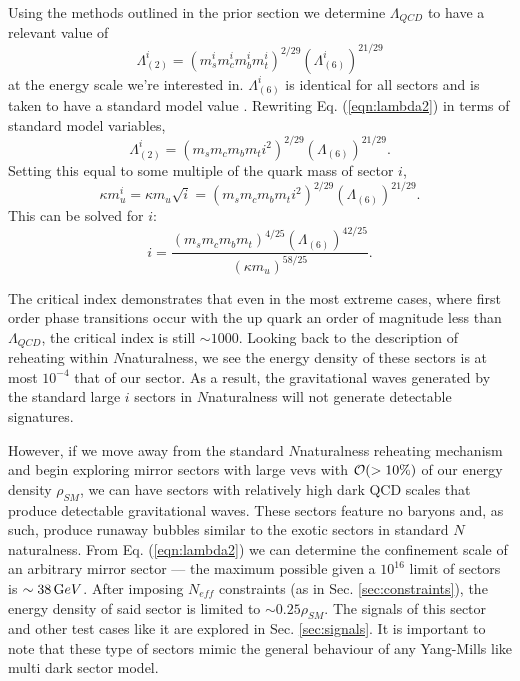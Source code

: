 \documentclass[nofootinbib,twocolumn,preprintnumbers]{revtex4-1}
\begin{document}
Using the methods outlined in the prior section we determine $\Lambda_{QCD}$ to have a relevant value of 
\begin{equation}\label{eqn:lambda2}
\Lambda^i_{(2)} = (m_s^i m_c^i m_b^i m_t^i)^{2/29}(\Lambda^i_{(6)})^{21/29}
\end{equation} 
at the energy scale we're interested in. $\Lambda^i_{(6)}$ is identical for all sectors and is taken to have a standard model value . Rewriting Eq. (\ref{eqn:lambda2}) in terms of standard model variables, 
\begin{equation}\label{eqn:lambda2adj}
\Lambda^i_{(2)} = (m_s m_c m_b m_t i^2)^{2/29}(\Lambda_{(6)})^{21/29}.
\end{equation}
Setting this equal to some multiple of the quark mass of sector $i$,
\begin{equation}
\kappa m^i_u = \kappa m_u \sqrt{i} = (m_s m_c m_b m_t i^2)^{2/29}(\Lambda_{(6)})^{21/29}.
\end{equation}
This can be solved for $i$:
\begin{equation}\label{eqn:critIndex}
i = \frac{(m_s m_c m_b m_t)^{4/25}(\Lambda_{(6)})^{42/25}}{(\kappa m_u)^{58/25}}.
\end{equation}
 
The critical index demonstrates that even in the most extreme cases, where first order phase transitions occur with the up quark an order of magnitude less than $\Lambda_{QCD}$, the critical index is still $\sim 1000$. Looking back to the description of reheating  within $N$naturalness, we see the energy density of these sectors is at most $10^{-4}$  that of our sector. As a result,  the gravitational waves generated by the standard large $i$ sectors in $N$naturalness will not generate detectable signatures. 

However, if we move away from the standard $N$naturalness reheating mechanism and begin exploring mirror sectors with large vevs with ${\cal O}( >10\%)$ of our energy density $\rho_{SM}$, we can have sectors with relatively high dark QCD scales that produce detectable gravitational waves. These sectors feature no baryons and, as such, produce runaway bubbles similar to the exotic sectors in standard $N$naturalness. From Eq. (\ref{eqn:lambda2}) we can determine the confinement scale of an arbitrary mirror sector --- the maximum possible given a $10^{16}$ limit \cite{Arkani-Hamed:2016rle}  of sectors is $\sim 38 \,{\mathrm GeV}$. After imposing $N_{eff}$ constraints (as in Sec. \ref{sec:constraints}), the energy density of said sector is limited to $\sim 0.25\rho_{SM}$. The signals of this sector and other test cases like it are explored in Sec. \ref{sec:signals}. It is important to note that these type of sectors mimic the general behaviour of any Yang-Mills like multi dark sector model. 
\end{document}
